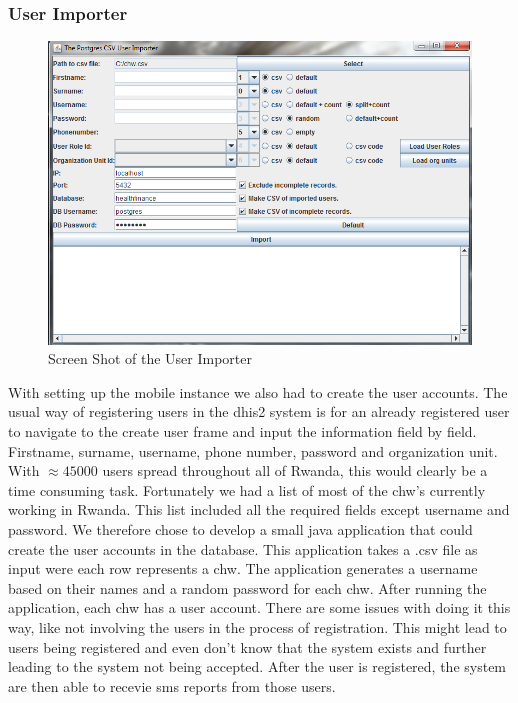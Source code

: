 \subsubsection{User Importer}

\begin{figure}
\centering
\includegraphics[width=\textwidth]{case/img/userImporterScreenShot}
\caption{Screen Shot of the User Importer}
\label{fig:screenUser}
\end{figure}

With setting up the mobile instance we also had to create the user accounts. 
The usual way of registering users in the \gls{dhis2} system is for an already registered user to navigate to the create user frame and input the information field by field. Firstname, surname, username, phone number, password and organization unit. With $\approx 45000$ users spread throughout all of Rwanda, this would clearly be a time consuming task. Fortunately we had a list of most of the \gls{chw}'s currently working in Rwanda. This list included all the required fields except username and password. We therefore chose to develop a small java application that could create the user accounts in the database. This application takes a .csv file as input were each row represents a \gls{chw}. The application generates a username based on their names and a random password for each \gls{chw}. After running the application, each \gls{chw} has a user account. There are some issues with doing it this way, like not involving the users in the process of registration. This might lead to users being registered and even don't know that the system exists and further leading to the system not being accepted. After the user is registered, the system are then able to recevie \gls{sms} reports from those users. 


